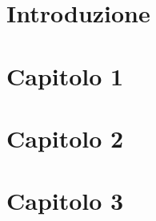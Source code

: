 \documentclass[a4paper, 12pt, twoside,openany]{book}
\begin{document}
\tableofcontents %

\chapter*{Introduzione} %

\chapter{Capitolo 1}
%

\chapter{Capitolo 2}
%

\chapter{Capitolo 3}
%

%
\printbibliography %
\end{document}
